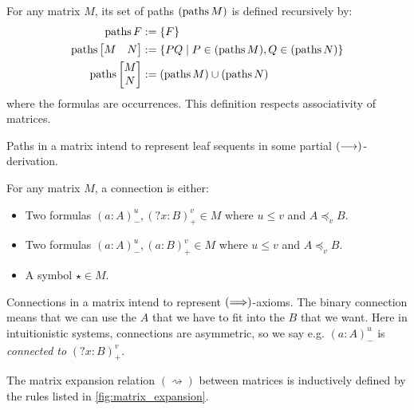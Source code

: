 \documentclass[twoside]{report}
\begin{document}
\begin{definition}
\label{def:matrix_path_set}
For any matrix $M$, its set of paths $(\operatorname{paths} M)$ is defined recursively by:
$$
\begin{aligned}
    \operatorname{paths} F &:= \{F\} \\
    \operatorname{paths} \begin{bmatrix}M & N\end{bmatrix} &:= \{PQ \mid P \in (\operatorname{paths} M), Q \in (\operatorname{paths} N)\} \\
    \operatorname{paths} \begin{bmatrix}M \\ N\end{bmatrix} &:= (\operatorname{paths} M) \cup (\operatorname{paths} N) \\
\end{aligned}
$$
where the formulas are occurrences. This definition respects associativity of matrices.
\end{definition}

Paths in a matrix intend to represent leaf sequents in some partial $(\longrightarrow)$-derivation.

\begin{definition}
\label{def:matrix_connections}
For any matrix $M$, a connection is either:
\begin{itemize}[noitemsep]
    \item Two formulas $(a : A)^u_-, ({?x} : B)^v_+ \in M$ where $u \leq v$ and $A \preceq_v B$.
    \item Two formulas $(a : A)^u_-, (a : B)^v_+ \in M$ where $u \leq v$ and $A \preceq_v B$.
    \item A symbol $\star \in M$.
\end{itemize}
\end{definition}

Connections in a matrix intend to represent $(\Longrightarrow)$-axioms. The binary connection means that we can use the $A$ that we have to fit into the $B$ that we want. Here in intuitionistic systems, connections are asymmetric, so we say e.g. $(a : A)^u_-$ is \emph{connected to} $({?x} : B)^v_+$.

\begin{definition}
\label{def:matrix_expansions}
The matrix expansion relation $(\rightsquigarrow)$ between matrices is inductively defined by the rules listed in \cref{fig:matrix_expansion}.
\end{definition}
\end{document}
